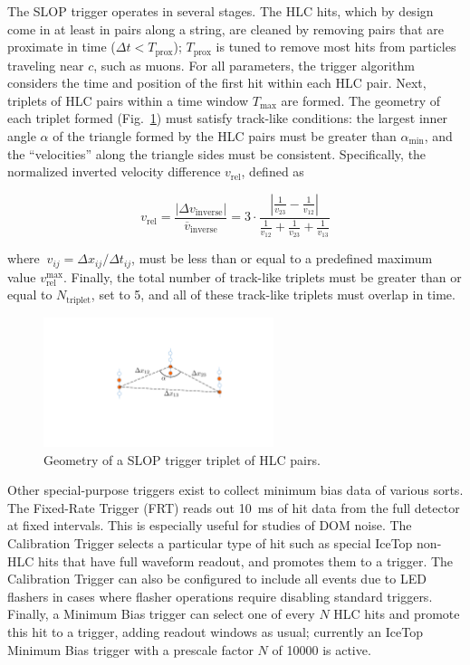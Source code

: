 The SLOP trigger operates in several stages.  The HLC hits, which by design
come in at least in pairs along a string, are cleaned by removing pairs that
are proximate in time ($\Delta t < T_{\mathrm{prox}}$); $T_{\mathrm{prox}}$
is tuned to remove most hits from particles traveling near $c$, such as muons.
For all parameters, the trigger algorithm considers the time and 
position of the first hit within each HLC pair.  Next, triplets of HLC
pairs within a time window $T_{\mathrm{max}}$ 
are formed.  The geometry of each triplet formed (Fig.~\ref{fig:slop})
must satisfy track-like 
conditions: the largest inner angle $\alpha$ of the triangle formed by the
HLC pairs must be greater than $\alpha_{\mathrm{min}}$, and the
``velocities'' along the triangle sides must be consistent.  Specifically,
the normalized inverted velocity difference $v_\mathrm{rel}$, defined as

\begin{equation}
  v_\mathrm{rel}=\frac{|\Delta
  v_\mathrm{inverse}|}{\overline{v}_\mathrm{inverse}} = 
  3\cdot\frac{|\frac{1}{v_{23}}-\frac{1}{v_{12}}|}
  {\frac{1}{v_{12}}+\frac{1}{v_{23}}+\frac{1}{v_{13}}}
\end{equation}

\noindent where $\ v_{ij} = \Delta x_{ij}/\Delta t_{ij}$, must be less than
or equal to a predefined maximum value
$v_{\mathrm{rel}}^{\mathrm{max}}$.  Finally, the total number of track-like triplets
must be greater than or equal to $N_{\mathrm{triplet}}$, set to 5, and all
of these track-like triplets must overlap in time.  

\begin{figure}[!ht]
 \centering
 \includegraphics[width=0.6\textwidth]{graphics/online/trigger/slop.pdf}
 \caption{Geometry of a SLOP trigger triplet of HLC pairs.}
 \label{fig:slop}
\end{figure}

Other special-purpose triggers exist to collect minimum bias data of
various sorts.  The Fixed-Rate Trigger (FRT) reads out 10~ms of hit data from
the full detector at fixed intervals.  This is especially useful for studies
of DOM noise.  The Calibration Trigger selects a particular type of hit
such as special IceTop non-HLC hits that have full waveform readout, and promotes
them to a trigger. The Calibration Trigger can also be configured to
include all events due to LED flashers in cases where flasher 
operations require disabling standard triggers. Finally, a Minimum Bias
trigger can select one of every $N$ HLC hits and promote this hit to a trigger, adding
readout windows as usual; currently an IceTop Minimum Bias trigger with a
prescale factor $N$ of 10000 is active.

